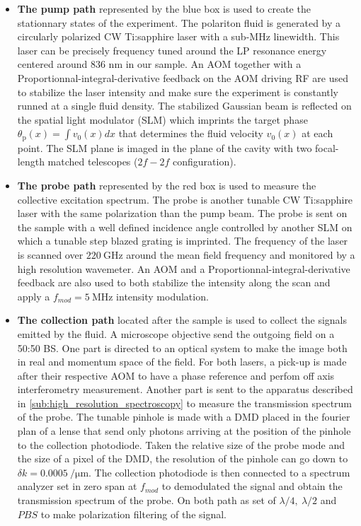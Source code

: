  \begin{itemize}
    \item \textbf{The pump path} represented by the blue box is used to create the stationnary states of the experiment. The polariton fluid is generated by a circularly polarized CW Ti:sapphire laser with a sub-MHz linewidth. This laser can be precisely frequency tuned around the LP resonance energy centered around 836 nm in our sample. An AOM 
    together with a Proportionnal-integral-derivative feedback on the AOM driving RF are used to stabilize the laser intensity and make sure the experiment is constantly runned at a single fluid density.
    The stabilized Gaussian beam is reflected on the spatial light modulator (SLM) which imprints the target phase $\theta_\mathrm{p}(x)=\int v_0(x)dx$ that determines the fluid velocity $v_0(x)$ at each point. The SLM plane is imaged in the plane of the cavity with two focal-length matched telescopes ($2f-2f$ configuration).
    \item \textbf{The probe path} represented by the red box is used to measure the collective excitation spectrum. The probe is another tunable CW Ti:sapphire laser with the same polarization than the pump beam. The probe is sent on the sample with a well defined incidence angle controlled by another SLM on which a tunable step blazed grating is imprinted. The frequency of
    the laser is scanned over $\SI{220}{\giga\hertz}$ around the mean field frequency and monitored by a high resolution wavemeter. An AOM and a Proportionnal-integral-derivative feedback are also used to both stabilize the intensity along the scan and apply a $f_{mod}=\SI{5}{\mega\hertz}$ intensity modulation.
    \item \textbf{The collection path} located after the sample is used to collect the signals emitted by the fluid. A microscope objective send the outgoing field on a 50:50 BS. One part is directed to an optical system to make the image both in real and momentum space of the field. For both lasers, a pick-up is made after their respective AOM to have a phase reference and perfom off axis interferometry measurement. Another part is sent to the apparatus described in \autoref{sub:high_resolution_spectroscopy} to measure the transmission spectrum of the probe. The tunable
    pinhole is made with a DMD placed in the fourier plan of a lense that send only photons arriving at the position of the pinhole to the collection photodiode. Taken 
    the relative size of the probe mode and the size of a pixel of the DMD, the resolution of the pinhole can go down to $\delta k = \SI{0.0005}{\per \micro\meter}$. The collection photodiode is then connected to a spectrum analyzer set in zero span at $f_{mod}$ to demodulated the signal and obtain the transmission spectrum of the probe. On both path
    as set of $\lambda/4,\ \lambda/2$ and $PBS$ to make polarization filtering of the signal.  
 \end{itemize}

